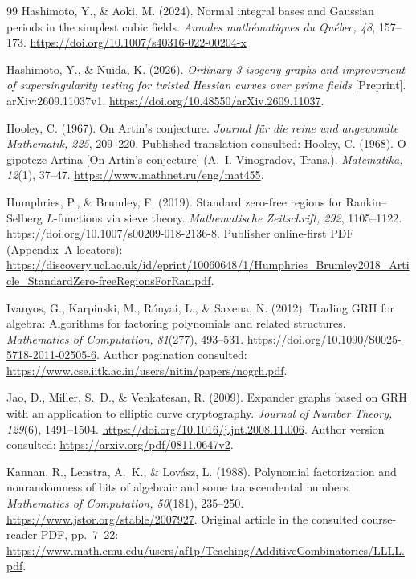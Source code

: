\documentclass[11pt]{article}
\theoremstyle{definition}
\theoremstyle{remark}
\begin{document}
\begin{thebibliography}{99}
Hashimoto, Y., \& Aoki, M. (2024).
Normal integral bases and Gaussian periods in the simplest cubic fields.
\emph{Annales math\'ematiques du Qu\'ebec, 48}, 157--173.
\url{https://doi.org/10.1007/s40316-022-00204-x}

Hashimoto, Y., \& Nuida, K. (2026).
\emph{Ordinary 3-isogeny graphs and improvement of supersingularity
testing for twisted Hessian curves over prime fields} [Preprint].
arXiv:2609.11037v1.
\url{https://doi.org/10.48550/arXiv.2609.11037}.

Hooley, C. (1967). On Artin's conjecture.
\emph{Journal f\"ur die reine und angewandte Mathematik, 225}, 209--220.
Published translation consulted: Hooley, C. (1968).
O gipoteze Artina [On Artin's conjecture] (A.~I. Vinogradov, Trans.).
\emph{Matematika, 12}(1), 37--47.
\url{https://www.mathnet.ru/eng/mat455}.

Humphries, P., \& Brumley, F. (2019).
Standard zero-free regions for Rankin--Selberg $L$-functions via sieve theory.
\emph{Mathematische Zeitschrift, 292}, 1105--1122.
\url{https://doi.org/10.1007/s00209-018-2136-8}.
Publisher online-first PDF (Appendix~A locators):
\url{https://discovery.ucl.ac.uk/id/eprint/10060648/1/Humphries_Brumley2018_Article_StandardZero-freeRegionsForRan.pdf}.

Ivanyos, G., Karpinski, M., R\'onyai, L., \& Saxena, N. (2012).
Trading GRH for algebra: Algorithms for factoring polynomials and related structures.
\emph{Mathematics of Computation, 81}(277), 493--531.
\url{https://doi.org/10.1090/S0025-5718-2011-02505-6}.
Author pagination consulted:
\url{https://www.cse.iitk.ac.in/users/nitin/papers/nogrh.pdf}.

Jao, D., Miller, S.~D., \& Venkatesan, R. (2009).
Expander graphs based on GRH with an application to elliptic curve cryptography.
\emph{Journal of Number Theory, 129}(6), 1491--1504.
\url{https://doi.org/10.1016/j.jnt.2008.11.006}.
Author version consulted: \url{https://arxiv.org/pdf/0811.0647v2}.

Kannan, R., Lenstra, A.~K., \& Lov\'asz, L. (1988).
Polynomial factorization and nonrandomness of bits of algebraic and
some transcendental numbers.
\emph{Mathematics of Computation, 50}(181), 235--250.
\url{https://www.jstor.org/stable/2007927}.
Original article in the consulted course-reader PDF, pp.~7--22:
\url{https://www.math.cmu.edu/users/af1p/Teaching/AdditiveCombinatorics/LLLL.pdf}.


\end{thebibliography}
\end{document}

